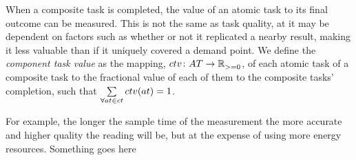 When a composite task is completed, the value of an atomic task to its final outcome can be measured. This is not the same as task quality, at it may be dependent on factors such as whether or not it replicated a nearby result, making it less valuable than if it uniquely covered a demand point. We define the \textit{component task value} as the mapping, $\formalComponentTaskValue{}{}$,  of each atomic task of a composite task to the fractional value of each of them to the composite tasks' completion, such that $\sum\limits_{\forall \varAtomicTask{}{} \in \varCompositeTask{}{}} \functionComponentTaskValue{}{} = 1$.

For example, the longer the sample time of the measurement the more accurate and higher quality the reading will be, but at the expense of using more energy resources. 
{Something goes here}